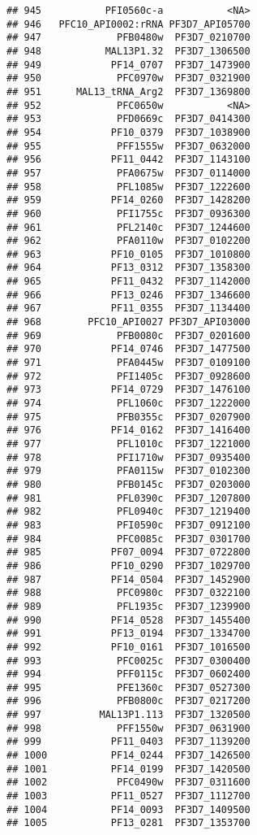 \documentclass[12pt, a4paper]{article}\usepackage[]{graphicx}\usepackage[]{color}
\makeatletter
\newenvironment{kframe}{%
 \def\at@end@of@kframe{}%
 \ifinner\ifhmode%
  \def\at@end@of@kframe{\end{minipage}}%
  \begin{minipage}{\columnwidth}%
 \fi\fi%
 \def\FrameCommand##1{\hskip\@totalleftmargin \hskip-\fboxsep
 \colorbox{shadecolor}{##1}\hskip-\fboxsep
     \hskip-\linewidth \hskip-\@totalleftmargin \hskip\columnwidth}%
 \MakeFramed {\advance\hsize-\width
   \@totalleftmargin\z@ \linewidth\hsize
   \@setminipage}}%
 {\par\unskip\endMakeFramed%
 \at@end@of@kframe}
\newenvironment{knitrout}{}{} %
\makeatother
\begin{document}
\begin{knitrout}
\begin{kframe}
\begin{verbatim}
## 945           PFI0560c-a           <NA>
## 946   PFC10_API0002:rRNA PF3D7_API05700
## 947             PFB0480w  PF3D7_0210700
## 948           MAL13P1.32  PF3D7_1306500
## 949            PF14_0707  PF3D7_1473900
## 950             PFC0970w  PF3D7_0321900
## 951      MAL13_tRNA_Arg2  PF3D7_1369800
## 952             PFC0650w           <NA>
## 953             PFD0669c  PF3D7_0414300
## 954            PF10_0379  PF3D7_1038900
## 955             PFF1555w  PF3D7_0632000
## 956            PF11_0442  PF3D7_1143100
## 957             PFA0675w  PF3D7_0114000
## 958             PFL1085w  PF3D7_1222600
## 959            PF14_0260  PF3D7_1428200
## 960             PFI1755c  PF3D7_0936300
## 961             PFL2140c  PF3D7_1244600
## 962             PFA0110w  PF3D7_0102200
## 963            PF10_0105  PF3D7_1010800
## 964            PF13_0312  PF3D7_1358300
## 965            PF11_0432  PF3D7_1142000
## 966            PF13_0246  PF3D7_1346600
## 967            PF11_0355  PF3D7_1134400
## 968        PFC10_API0027 PF3D7_API03000
## 969             PFB0080c  PF3D7_0201600
## 970            PF14_0746  PF3D7_1477500
## 971             PFA0445w  PF3D7_0109100
## 972             PFI1405c  PF3D7_0928600
## 973            PF14_0729  PF3D7_1476100
## 974             PFL1060c  PF3D7_1222000
## 975             PFB0355c  PF3D7_0207900
## 976            PF14_0162  PF3D7_1416400
## 977             PFL1010c  PF3D7_1221000
## 978             PFI1710w  PF3D7_0935400
## 979             PFA0115w  PF3D7_0102300
## 980             PFB0145c  PF3D7_0203000
## 981             PFL0390c  PF3D7_1207800
## 982             PFL0940c  PF3D7_1219400
## 983             PFI0590c  PF3D7_0912100
## 984             PFC0085c  PF3D7_0301700
## 985            PF07_0094  PF3D7_0722800
## 986            PF10_0290  PF3D7_1029700
## 987            PF14_0504  PF3D7_1452900
## 988             PFC0980c  PF3D7_0322100
## 989             PFL1935c  PF3D7_1239900
## 990            PF14_0528  PF3D7_1455400
## 991            PF13_0194  PF3D7_1334700
## 992            PF10_0161  PF3D7_1016500
## 993             PFC0025c  PF3D7_0300400
## 994             PFF0115c  PF3D7_0602400
## 995             PFE1360c  PF3D7_0527300
## 996             PFB0800c  PF3D7_0217200
## 997          MAL13P1.113  PF3D7_1320500
## 998             PFF1550w  PF3D7_0631900
## 999            PF11_0403  PF3D7_1139200
## 1000           PF14_0244  PF3D7_1426500
## 1001           PF14_0199  PF3D7_1420500
## 1002            PFC0490w  PF3D7_0311600
## 1003           PF11_0527  PF3D7_1112700
## 1004           PF14_0093  PF3D7_1409500
## 1005           PF13_0281  PF3D7_1353700

\end{verbatim}
\end{kframe}
\end{knitrout}
\end{document}
